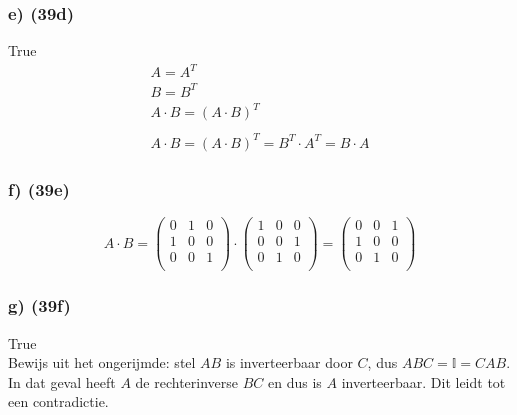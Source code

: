 \documentclass[lineaire_algebra_oplossingen.tex]{subfiles}
\begin{document}
\subsubsection*{e) (39d)}
True
\begin{gather*}
A=A^{T}\\
B=B^{T}\\
A \cdot B=(A \cdot B)^{T}\\
\\
A \cdot B=(A \cdot B)^{T}=B^T \cdot A^T=B \cdot A
\end{gather*}

\subsubsection*{f) (39e)}
\[
A \cdot B = \left( \begin{array}{ccc}
    0 & 1 & 0 \\
    1 & 0 & 0 \\
    0 & 0 & 1 \\
  \end{array} \right)  \cdot  \left( \begin{array}{ccc}
    1 & 0 & 0 \\
    0 & 0 & 1 \\
    0 & 1 & 0 \\
  \end{array} \right) = \left( \begin{array}{ccc}
    0 & 0 & 1 \\
    1 & 0 & 0 \\
    0 & 1 & 0 \\
 \end{array} \right) 
 \]

\subsubsection*{g) (39f)}
True\\
Bewijs uit het ongerijmde: stel $AB$ is inverteerbaar door $C$, dus $ABC = \mathbb{I} = CAB$. In dat geval heeft $A$ de rechterinverse $BC$ en dus is $A$ inverteerbaar. Dit leidt tot een contradictie.
\end{document}
